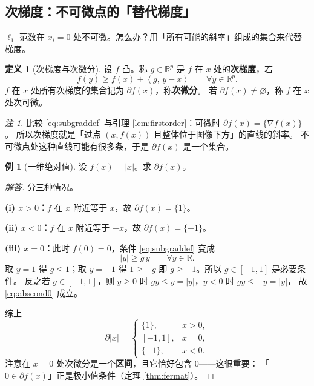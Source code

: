 \documentclass[11pt,a4paper,UTF8]{ctexart}
\theoremstyle{plain}
\theoremstyle{definition}
\newtheorem{definition}[theorem]{定义}
\newtheorem{example}[theorem]{例}
\theoremstyle{remark}
\newtheorem{remark}[theorem]{注}
\newcommand{\R}{\mathbb{R}}
\newcommand{\abs}[1]{\left\lvert #1 \right\rvert}
\newcommand{\inner}[2]{\left\langle #1,\, #2 \right\rangle}
\begin{document}
\subsection{次梯度：不可微点的「替代梯度」}

$\ell_1$ 范数在 $x_i=0$ 处不可微。怎么办？用「所有可能的斜率」组成的集合来代替梯度。

\begin{definition}[次梯度与次微分]\label{def:subgrad}
设 $f$ 凸。称 $g\in\R^p$ 是 $f$ 在 $x$ 处的\textbf{次梯度}，若
\begin{equation}
f(y)\ge f(x)+\inner{g}{y-x}\qquad\forall y\in\R^p .
\label{eq:subgraddef}
\end{equation}
$f$ 在 $x$ 处所有次梯度的集合记为 $\partial f(x)$，称\textbf{次微分}。
若 $\partial f(x)\neq\varnothing$，称 $f$ 在 $x$ 处次可微。
\end{definition}

\begin{remark}
比较 \eqref{eq:subgraddef} 与引理 \ref{lem:firstorder}：可微时 $\partial f(x)=\{\nabla f(x)\}$。
所以次梯度就是「过点 $(x,f(x))$ 且整体位于图像下方」的直线的斜率。
不可微点处这种直线可能有很多条，于是 $\partial f(x)$ 是一个集合。
\end{remark}

\begin{example}[一维绝对值]\label{ex:abs}
设 $f(x)=\abs{x}$。求 $\partial f(x)$。
\end{example}

\begin{proof}[解答]
分三种情况。

\textbf{(i) $x>0$：}$f$ 在 $x$ 附近等于 $x$，故 $\partial f(x)=\{1\}$。

\textbf{(ii) $x<0$：}$f$ 在 $x$ 附近等于 $-x$，故 $\partial f(x)=\{-1\}$。

\textbf{(iii) $x=0$：}此时 $f(0)=0$，条件 \eqref{eq:subgraddef} 变成
\begin{equation}
\abs{y}\ge g\,y\qquad\forall y\in\R .
\label{eq:abscond0}
\end{equation}
取 $y=1$ 得 $g\le1$；取 $y=-1$ 得 $1\ge-g$ 即 $g\ge-1$。所以 $g\in[-1,1]$ 是必要条件。
反之若 $g\in[-1,1]$，则 $y\ge0$ 时 $gy\le y=\abs{y}$，$y<0$ 时 $gy\le -y=\abs{y}$，
故 \eqref{eq:abscond0} 成立。

综上
\[
\partial\abs{x}=
\begin{cases}
\{1\}, & x>0,\\
[-1,1], & x=0,\\
\{-1\}, & x<0 .
\end{cases}
\]
注意在 $x=0$ 处次微分是一个\textbf{区间}，且它恰好包含 $0$——这很重要：
「$0\in\partial f(x)$」正是极小值条件（定理 \ref{thm:fermat}）。
\end{proof}
\end{document}
